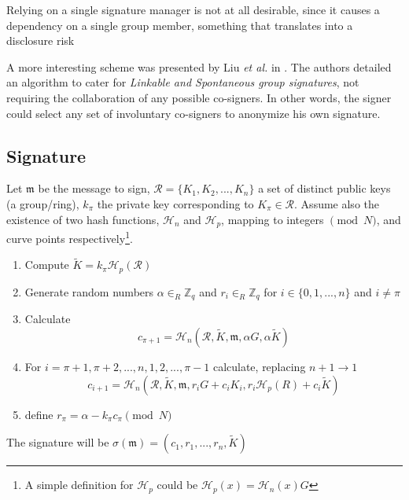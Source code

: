 Relying on a single signature manager is not at all desirable, since it causes a dependency on a single group member, something that
translates into a disclosure risk

A more interesting scheme was presented by  Liu {\em et al.} in \cite{Liu2004}. The authors detailed an algorithm to cater for {\em Linkable and Spontaneous group signatures}, not requiring the collaboration of any possible co-signers.
In other words, the signer could select any set of involuntary co-signers to anonymize his own signature. 


\subsection*{Signature}

Let \(\mathfrak{m}\) be the message to sign, \(\mathcal{R} = \{K_1, K_2, ..., K_n\}\) a set of distinct public keys (a group/ring), \(k_\pi\) the private key corresponding to \(K_\pi \in \mathcal{R}\). Assume also the existence of two hash functions, \(\mathcal{H}_n\) and \(\mathcal{H}_p\),
mapping to integers \(\pmod N\), and curve points respectively\footnote{ 
	A simple definition for \(\mathcal{H}_p\) 
	could be \(\mathcal{H}_p(x) = \mathcal{H}_n(x) G\)
}.

\begin{enumerate}
	\item Compute \(\tilde{K} = k_\pi \mathcal{H}_p(\mathcal{R})\)
	
	\item Generate random numbers \(\alpha \in_R \mathbb{Z}_q\) and  \(r_i \in_R \mathbb{Z}_q\) for \(i \in \{0, 1, ..., n\}\) and \(i \ne \pi\)
	
	\item Calculate
	\[c_{\pi+1} = \mathcal{H}_n(\mathcal{R}, \tilde{K}, \mathfrak{m}, \alpha G, \alpha \tilde{K} )\]
	
	\item For \(i = \pi+1, \pi+2, ..., n, 1, 2, ..., \pi-1\) calculate, replacing \(n + 1 \rightarrow 1\)
	\[  c_{i+1} = \mathcal{H}_n(\mathcal{R}, \tilde{K}, \mathfrak{m}, r_i G + c_i K_i, r_i \mathcal{H}_p(R) + c_i \tilde{K} )  \] 
	
	
	\item define \(r_\pi = \alpha -k_\pi c_\pi \pmod N\)
	
\end{enumerate}

The signature will be \(\sigma(\mathfrak{m}) = (c_1, r_1, ..., r_n, \tilde{K}) \)

